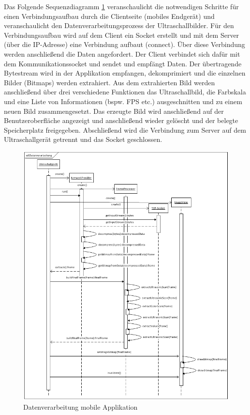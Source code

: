 Das Folgende Sequenzdiagramm \ref{fig:SD_Datenverarbeitung} veranschaulicht die notwendigen Schritte für einen Verbindungsaufbau durch die Clientseite (mobiles Endgerät) und veranschaulicht den Datenverarbeitungsprozess der Ultraschallbilder. Für den Verbindungsaufbau wird auf dem Client ein Socket erstellt und mit dem Server (über die IP-Adresse) eine Verbindung aufbaut (connect). Über diese Verbindung werden anschließend die Daten angefordert. Der Client verbindet sich dafür mit dem Kommunikationssocket und sendet und empfängt Daten. Der übertragende Bytestream wird in der Applikation empfangen, dekomprimiert und die einzelnen Bilder (Bitmaps) werden extrahiert. Aus dem extrahierten Bild werden anschließend über drei verschiedene Funktionen das Ultraschallbild, die Farbskala und eine Liste von Informationen (bspw. FPS etc.) ausgeschnitten und zu einem neuen Bild zusammengesetzt. Das erzeugte Bild wird anschließend auf der Benutzeroberfläche angezeigt und anschließend wieder gelöscht und der belegte Speicherplatz freigegeben. Abschließend wird die Verbindung zum Server auf dem Ultraschallgerät getrennt und das Socket geschlossen.

\begin{figure}[H] 
\centering
\includegraphics[width=1\textwidth]{Bilder/objektorientierteAnalyseundEntwurf/SD_Datenverarbeitung}
\caption{{\small Datenverarbeitung mobile Applikation}}
\label{fig:SD_Datenverarbeitung}
\end{figure}

